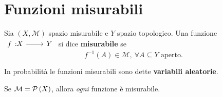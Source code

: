 \section{Funzioni misurabili}
\begin{define}
	Sia $\left(X, \mathcal{M}\right)$ spazio misurabile e $Y$ spazio topologico. Una funzione $\funz{f}{X}{Y}$ si dice \textbf{misurabile} se \begin{equation}
		f^{-1}\left(A\right)\in\mathcal{M},\ \forall A\subseteq Y\text{ aperto.}
	\end{equation}
\end{define}
\begin{digression}
	In probabilità le funzioni misurabili sono dette \textbf{variabili aleatorie}. %
\end{digression}
\begin{observe}
	Se $\mathcal{M}=\mathcal{P}\left(X\right)$, allora \textit{ogni} funzione è misurabile.
\end{observe}
